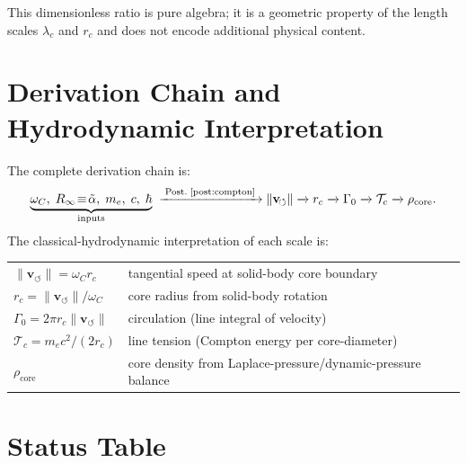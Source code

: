 \documentclass[aps,pra,preprint,longbibliography,nofootinbib]{revtex4-2}
\newcommand{\vnorm}{\lVert\mathbf{v}_{\!\boldsymbol{\circlearrowleft}}\rVert} %
\newcommand{\rhocore}{\rho_{\mathrm{core}}}      %
\newcommand{\rc}{r_c}                            %
\newcommand{\omC}{\omega_C}                      %
\newcommand{\lc}{\lambda_c}                      %
\newcommand{\Rinf}{R_\infty}                     %
\newcommand{\Tc}{\mathcal{T}_c}                  %
\newcommand{\Gz}{\Gamma_0}                       %
\begin{document}
This dimensionless ratio is pure algebra; it is a geometric property
of the length scales $\lc$ and $\rc$ and does not encode additional
physical content.

\section{Derivation Chain and Hydrodynamic Interpretation}
\label{sec:chain}

The complete derivation chain is:
\begin{equation}
  \underbrace{\omC,\;\Rinf\!\equiv\!\tilde\alpha,\;m_e,\;c,\;\hbar}_{\text{inputs}}
  \;\xrightarrow{\;\text{Post.\;\ref{post:compton}}\;}
  \vnorm
  \xrightarrow{}
  \rc
  \xrightarrow{}
  \Gz
  \xrightarrow{}
  \Tc
  \xrightarrow{}
  \rhocore.
  \label{eq:chain}
\end{equation}
The classical-hydrodynamic interpretation of each scale is:

\medskip
\begin{tabular}{@{}ll@{}}
$\vnorm = \omC\rc$ & tangential speed at solid-body core boundary \\
$\rc = \vnorm/\omC$ & core radius from solid-body rotation \\
$\Gz = 2\pi\rc\vnorm$ & circulation (line integral of velocity) \\
$\Tc = m_e c^2/(2\rc)$ & line tension (Compton energy per core-diameter) \\
$\rhocore$ & core density from Laplace-pressure/dynamic-pressure balance \\
\end{tabular}

\section{Status Table}
\label{sec:status}
\end{document}
